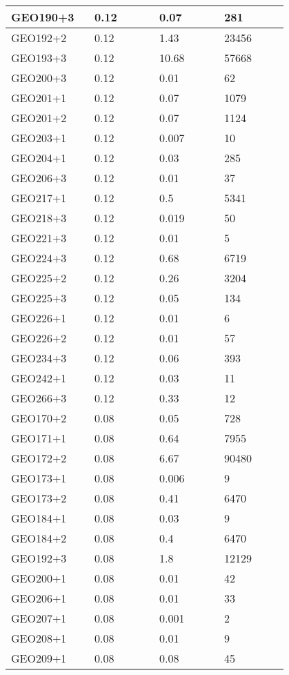 \begin{longtable}[H]{|p{0.2\linewidth}|p{0.2\linewidth}|p{0.2\linewidth}|p{0.2\linewidth}|}
\hline
GEO190+3 & 0.12 &  0.07 & 281 \\
\hline
GEO192+2 & 0.12 &  1.43 & 23456 \\
\hline
GEO193+3 & 0.12 &  10.68 & 57668 \\
\hline
GEO200+3 & 0.12 &  0.01 & 62 \\
\hline
GEO201+1 & 0.12 &  0.07 & 1079 \\
\hline
GEO201+2 & 0.12 &  0.07 & 1124 \\
\hline
GEO203+1 & 0.12 &  0.007 & 10 \\
\hline
GEO204+1 & 0.12 &  0.03 & 285 \\
\hline
GEO206+3 & 0.12 &  0.01 & 37 \\
\hline
GEO217+1 & 0.12 &  0.5 & 5341 \\
\hline
GEO218+3 & 0.12 &  0.019 & 50 \\
\hline
GEO221+3 & 0.12 &  0.01 & 5 \\
\hline
GEO224+3 & 0.12 &  0.68 & 6719 \\
\hline
GEO225+2 & 0.12 &  0.26 & 3204 \\
\hline
GEO225+3 & 0.12 &  0.05 & 134 \\
\hline
GEO226+1 & 0.12 &  0.01 & 6 \\
\hline
GEO226+2 & 0.12 &  0.01 & 57 \\
\hline
GEO234+3 & 0.12 &  0.06 & 393 \\
\hline
GEO242+1 & 0.12 &  0.03 & 11 \\
\hline
GEO266+3 & 0.12 &  0.33 & 12 \\
\hline
GEO170+2 & 0.08 & 0.05 & 728 \\
\hline
GEO171+1 & 0.08 & 0.64 & 7955 \\
\hline
GEO172+2 & 0.08 & 6.67 & 90480 \\
\hline
GEO173+1 & 0.08 & 0.006 & 9 \\
\hline
GEO173+2 & 0.08 & 0.41 & 6470 \\
\hline
GEO184+1 & 0.08 & 0.03 & 9 \\
\hline
GEO184+2 & 0.08 & 0.4 & 6470 \\
\hline
GEO192+3 & 0.08 & 1.8 & 12129 \\
\hline
GEO200+1 & 0.08 & 0.01 & 42 \\
\hline
GEO206+1 & 0.08 & 0.01 & 33 \\
\hline
GEO207+1 & 0.08 & 0.001 & 2  \\
\hline
GEO208+1 & 0.08 & 0.01 & 9 \\
\hline
GEO209+1 & 0.08 & 0.08 & 45 \\

\end{longtable}

